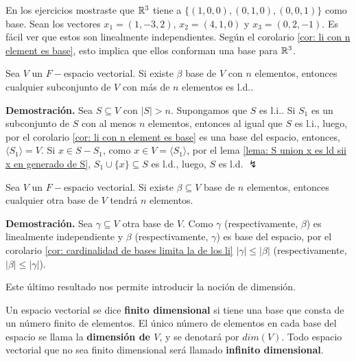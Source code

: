 \QEDB
\vspace{0.2cm}

\begin{ejem}
En los ejercicios mostraste que $\mathbb{R}^{3}$ tiene a 
$\{ (1, 0, 0), (0, 1, 0), (0, 0, 1) \}$ como base. Sean
los vectores 
$x_{1} = (1, -3, 2)$,
$x_{2} = (4, 1, 0)$ y $x_{3} = (0, 2, -1)$. Es fácil ver que
estos son linealmente independientes. Según el corolario
\ref{cor: li con n element es base}, esto implica que
ellos conforman una base para $\mathbb{R}^{3}$.
\end{ejem}

\begin{cor}
	\label{cor: cardinalidad de bases limita la de los li}
Sea $V$ un $F-$espacio vectorial. Si existe $\beta$ base de
$V$ con $n$ elementos, entonces cualquier subconjunto de $V$
con más de $n$ elementos es l.d..
\end{cor}
\noindent
\textbf{Demostración.}
Sea $S \subseteq V$ con $|S| > n$. Supongamos que $S$ es l.i..
Si $S_{1}$ es un subconjunto de $S$ con al menos $n$ elementos, 
entonces al igual que $S$ es l.i., luego, por el corolario 
\ref{cor: li con n element es base} es una base del espacio,
entonces,  $\langle S_{1} \rangle = V$.
Si $x \in S - S_{1}$, como $x \in V = \langle S_{1} \rangle$,
por el lema 
\ref{lema: S union x es ld sii x en generado de S},
$S_{1} \cup \{ x \} \subseteq S$ es l.d., luego,
$S$ es l.d.  $\lightning$

\QEDB
\vspace{0.2cm}

\begin{cor}
Sea $V$ un $F-$espacio vectorial. Si existe 
$\beta \subseteq V$ base de $n$ elementos, entonces
cualquier otra base de $V$ tendrá $n$ elementos.
\end{cor}
\noindent
\textbf{Demostración.}
Sea $\gamma \subseteq V$ otra base de $V$.
Como $\gamma$ (respectivamente, $\beta$) es linealmente independiente
y $\beta$ (respectivamente, $\gamma$) es base del espacio,
por el corolario 
\ref{cor: cardinalidad de bases limita la de los li}
$|\gamma| \leq |\beta|$ (respectivamente, 
$|\beta| \leq |\gamma|$).

\QEDB
\vspace{0.2cm}

Este último resultado nos permite introducir la noción 
de dimensión.

\begin{defi}
Un espacio vectorial se dice \textbf{finito dimensional}
si tiene una base que consta de un número finito de elementos.
El único número de elementos en cada base del espacio se llama
la \textbf{dimensión de $V$}, y se denotará por
$dim(V)$. Todo espacio vectorial que no sea finito dimensional
será llamado \textbf{infinito dimensional}.
\end{defi}

